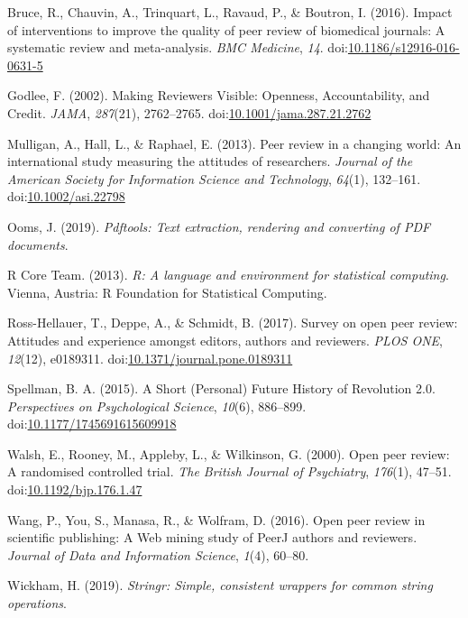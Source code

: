 \documentclass[,jou, a4paper,floatsintext]{apa6}
\begin{document}
\leavevmode\hypertarget{ref-bruce_impact_2016}{}%
Bruce, R., Chauvin, A., Trinquart, L., Ravaud, P., \& Boutron, I. (2016). Impact of interventions to improve the quality of peer review of biomedical journals: A systematic review and meta-analysis. \emph{BMC Medicine}, \emph{14}. doi:\href{https://doi.org/10.1186/s12916-016-0631-5}{10.1186/s12916-016-0631-5}

\leavevmode\hypertarget{ref-godlee_making_2002}{}%
Godlee, F. (2002). Making Reviewers Visible: Openness, Accountability, and Credit. \emph{JAMA}, \emph{287}(21), 2762--2765. doi:\href{https://doi.org/10.1001/jama.287.21.2762}{10.1001/jama.287.21.2762}

\leavevmode\hypertarget{ref-mulligan_peer_2013}{}%
Mulligan, A., Hall, L., \& Raphael, E. (2013). Peer review in a changing world: An international study measuring the attitudes of researchers. \emph{Journal of the American Society for Information Science and Technology}, \emph{64}(1), 132--161. doi:\href{https://doi.org/10.1002/asi.22798}{10.1002/asi.22798}

\leavevmode\hypertarget{ref-ooms_pdftools_2019}{}%
Ooms, J. (2019). \emph{Pdftools: Text extraction, rendering and converting of PDF documents}.

\leavevmode\hypertarget{ref-r_core_team_r_2013}{}%
R Core Team. (2013). \emph{R: A language and environment for statistical computing}. Vienna, Austria: R Foundation for Statistical Computing.

\leavevmode\hypertarget{ref-ross-hellauer_survey_2017}{}%
Ross-Hellauer, T., Deppe, A., \& Schmidt, B. (2017). Survey on open peer review: Attitudes and experience amongst editors, authors and reviewers. \emph{PLOS ONE}, \emph{12}(12), e0189311. doi:\href{https://doi.org/10.1371/journal.pone.0189311}{10.1371/journal.pone.0189311}

\leavevmode\hypertarget{ref-spellman_short_2015}{}%
Spellman, B. A. (2015). A Short (Personal) Future History of Revolution 2.0. \emph{Perspectives on Psychological Science}, \emph{10}(6), 886--899. doi:\href{https://doi.org/10.1177/1745691615609918}{10.1177/1745691615609918}

\leavevmode\hypertarget{ref-walsh_open_2000}{}%
Walsh, E., Rooney, M., Appleby, L., \& Wilkinson, G. (2000). Open peer review: A randomised controlled trial. \emph{The British Journal of Psychiatry}, \emph{176}(1), 47--51. doi:\href{https://doi.org/10.1192/bjp.176.1.47}{10.1192/bjp.176.1.47}

\leavevmode\hypertarget{ref-wang_open_2016}{}%
Wang, P., You, S., Manasa, R., \& Wolfram, D. (2016). Open peer review in scientific publishing: A Web mining study of PeerJ authors and reviewers. \emph{Journal of Data and Information Science}, \emph{1}(4), 60--80.

\leavevmode\hypertarget{ref-wickham_stringr_2019}{}%
Wickham, H. (2019). \emph{Stringr: Simple, consistent wrappers for common string operations}.
\end{document}
